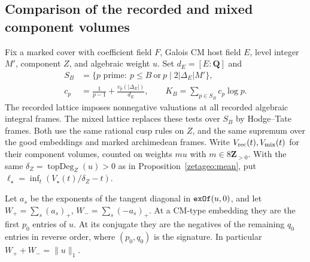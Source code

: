 \subsection{Comparison of the recorded and mixed component volumes}
\label{mixrec:section}

Fix a marked cover with coefficient field \(F\), Galois CM host
field \(E\), level integer \(M'\), component \(Z\), and algebraic
weight \(u\). Set \(d_E=[E:\mathbf Q]\) and
\begin{align*}
 S_B&=\{p\text{ prime}:\ p\le B\ \text{or}\ p\mid 2|\Delta_E|M'\},\\
 c_p&=\frac{1}{p-1}+\frac{v_p(|\Delta_E|)}{d_E},
 \qquad K_B=\sum_{p\in S_B}c_p\log p .
\end{align*}
The recorded lattice imposes nonnegative valuations at all recorded
algebraic integral frames. The mixed lattice replaces these tests
over \(S_B\) by Hodge--Tate frames. Both use the same rational cusp
rules on \(Z\), and the same supremum over the good embeddings and
marked archimedean frames. Write \(V_{\rm rec}(t),V_{\rm mix}(t)\)
for their component volumes, counted on weights \(mu\) with
\(m\in8\mathbf Z_{>0}\). With the same \(\delta_Z=\operatorname{topDeg}_Z(u)>0\)
as in Proposition~\ref{zetageo:mean}, put
\(\ell_\star=\inf_t(V_\star(t)/\delta_Z-t)\).

Let \(a_s\) be the exponents of the tangent diagonal in
\(\texttt{exOf}(u,0)\), and let
\(W_+=\sum_s(a_s)_+\), \(W_-=\sum_s(-a_s)_+\).
At a CM-type embedding they are the first \(p_0\) entries of \(u\).
At its conjugate they are the negatives of the remaining \(q_0\)
entries in reverse order, where \((p_0,q_0)\) is the signature.
In particular \(W_++W_-=\|u\|_1\).

